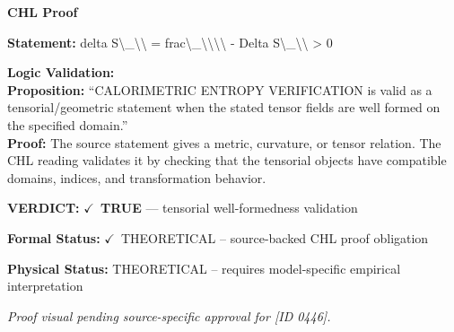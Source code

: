 \vspace{0.45em}
\noindent\textbf{CHL Proof}\par
\textbf{Statement:} delta S\textbackslash{}\_\textbackslash{}\textbackslash{} = frac\textbackslash{}\_\textbackslash{}\textbackslash{}\textbackslash{}\textbackslash{} - Delta S\textbackslash{}\_\textbackslash{}\textbackslash{} > 0

\textbf{Logic Validation:}\\
\textbf{Proposition:} ``CALORIMETRIC ENTROPY VERIFICATION is valid as a tensorial/geometric statement when the
stated tensor fields are well formed on the specified domain.''\\
\textbf{Proof:} The source statement gives a metric, curvature, or tensor relation. The CHL reading
validates it by checking that the tensorial objects have compatible domains, indices,
and transformation behavior.

\textbf{VERDICT:} \ensuremath{\checkmark}\ \textbf{TRUE} --- tensorial well-formedness validation

\textbf{Formal Status:} \ensuremath{\checkmark}\ THEORETICAL -- source-backed CHL proof obligation

\textbf{Physical Status:} THEORETICAL -- requires model-specific empirical interpretation
\par\vspace{0.45em}
\par
\vfill
\begingroup\footnotesize\itshape
Proof visual pending source-specific approval for [ID 0446].
\par\endgroup
\vfill
\endgroup
\endgroup
